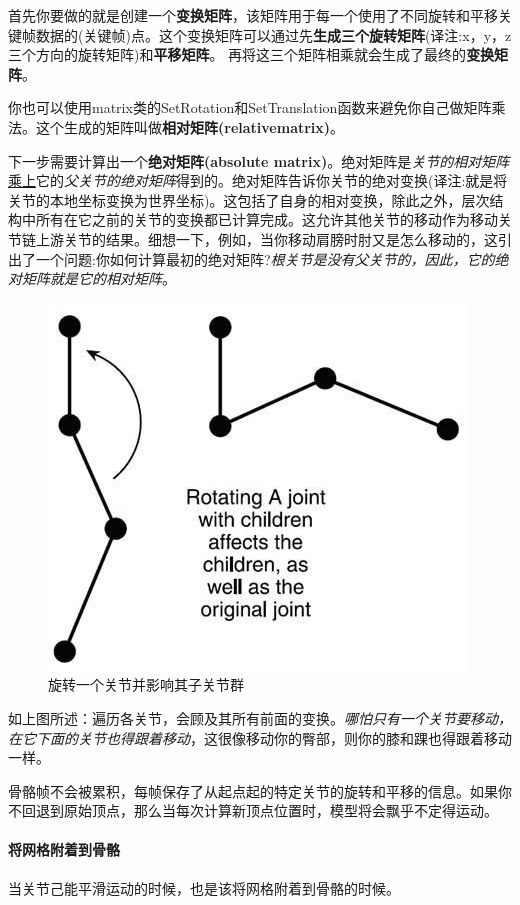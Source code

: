 \documentclass[UTF8,a4paper,12pt]{ctexbook}
\begin{document}
				首先你要做的就是创建一个\textbf{变换矩阵}，该矩阵用于每一个使用了不同旋转和平移关键帧数据的(关键帧)点。这个变换矩阵可以通过先\textbf{生成三个旋转矩阵}(译注:x，y，z三个方向的旋转矩阵)和\textbf{平移矩阵}。
				再将这三个矩阵相乘就会生成了最终的\textbf{变换矩阵}。
				
				你也可以使用matrix类的SetRotation和SetTranslation函数来避免你自己做矩阵乘法。这个生成的矩阵叫做\textbf{相对矩阵(relativematrix)}。
				
				下一步需要计算出一个\textbf{绝对矩阵(absolute matrix)}。绝对矩阵是\textit{关节的相对矩阵}\underline{乘上}它的\textit{父关节的绝对矩阵}得到的。绝对矩阵告诉你关节的绝对变换(译注:就是将关节的本地坐标变换为世界坐标)。这包括了自身的相对变换，除此之外，层次结构中所有在它之前的关节的变换都已计算完成。这允许其他关节的移动作为移动关节链上游关节的结果。细想一下，例如，当你移动肩膀时肘又是怎么移动的，这引出了一个问题:你如何计算最初的绝对矩阵?\textit{根关节是没有父关节的，因此，它的绝对矩阵就是它的相对矩阵}。
				
					\begin{figure}[H]
						\centering
						\includegraphics[width=.6\linewidth]{SkeletonTheory04}
						\caption{旋转一个关节并影响其子关节群}
					\end{figure}
					
				如上图所述：遍历各关节，会顾及其所有前面的变换。\textit{哪怕只有一个关节要移动，在它下面的关节也得跟着移动}，这很像移动你的臀部，则你的膝和踝也得跟着移动一样。
				
				骨骼帧不会被累积，每帧保存了从起点起的特定关节的旋转和平移的信息。如果你不回退到原始顶点，那么当每次计算新顶点位置时，模型将会飘乎不定得运动。
			
			\paragraph{将网格附着到骨骼}
				当关节己能平滑运动的时候，也是该将网格附着到骨骼的时候。
				
\end{document}
